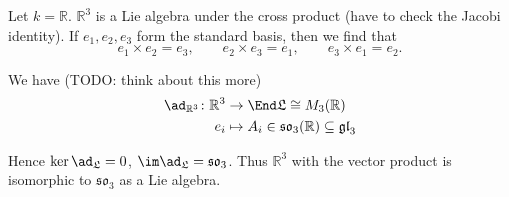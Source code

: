 Let $k = \mathbb{R}$. $\mathbb{R}^3$ is a Lie algebra under the cross product
(have to check the Jacobi identity). If $e_1, e_2, e_3$ form the standard basis,
then we find that
\[ e_1 \times e_2 = e_3,\qquad e_2\times e_3 = e_1,\qquad e_3\times e_1=e_2. \]

We have (TODO: think about this more)
\begin{align*}
	\ad_{\mathbb{R}^3}\colon \mathbb{R}^3&\to \End \mathfrak{L}\cong M_3(\mathbb{R})\\
	e_i&\mapsto A_i \in \mathfrak{so}_3(\mathbb{R}) \subseteq \mathfrak{gl}_3
\end{align*}

Hence $\ker\ad_{\mathfrak{L}} = 0$, $\im\ad_{\mathfrak{L}} = \mathfrak{so}_3$.
Thus $\mathbb{R}^3$ with the vector product is isomorphic to $\mathfrak{so}_3$ as
a Lie algebra.
